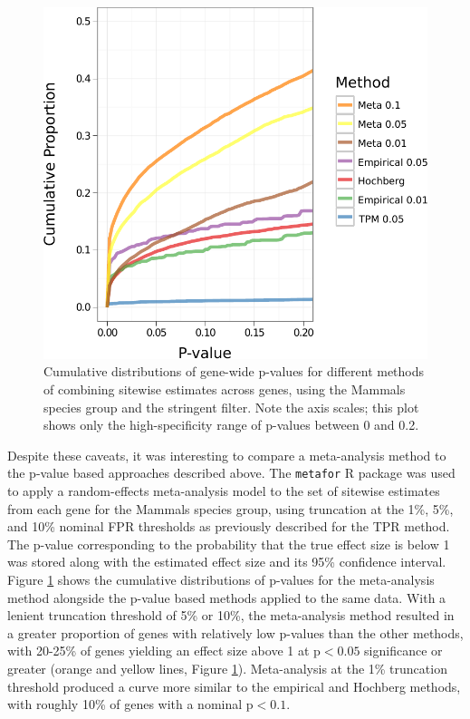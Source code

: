 \begin{figure}
\centering \scriptsize
\includegraphics[scale=0.8]{Figs/meta_pvals.pdf}
\caption{Cumulative distributions of gene-wide p-values for different
  methods of combining sitewise estimates across genes, using the
  Mammals species group and the stringent filter. Note the axis
  scales; this plot shows only the high-specificity range of p-values
  between 0 and 0.2.}
\label{fig_meta_pvals}
\end{figure}

Despite these caveats, it was interesting to compare a meta-analysis
method to the p-value based approaches described above. The
\texttt{metafor} R package \citep{Viechtbauer2010} was used to apply a
random-effects meta-analysis model to the set of sitewise estimates
from each gene for the Mammals species group, using truncation at the
1\%, 5\%, and 10\% nominal FPR thresholds as previously described for
the TPR method. The p-value corresponding to the probability that the
true effect size is below 1 was stored along with the estimated effect
size and its 95\% confidence interval. Figure \ref{fig_meta_pvals}
shows the cumulative distributions of p-values for the meta-analysis
method alongside the p-value based methods applied to the same
data. With a lenient truncation threshold of 5\% or 10\%, the
meta-analysis method resulted in a greater proportion of genes with
relatively low p-values than the other methods, with 20-25\% of genes
yielding an effect size above 1 at p$<0.05$ significance or greater
(orange and yellow lines, Figure \ref{fig_meta_pvals}). Meta-analysis
at the 1\% truncation threshold produced a curve more similar to the
empirical and Hochberg methods, with roughly 10\% of genes with a
nominal p$<0.1$.

